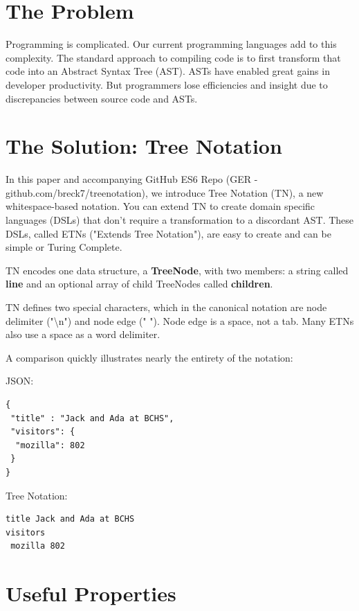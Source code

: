 \documentclass[journal]{IEEEtran}
\begin{document}
\section{The Problem}

Programming is complicated. Our current programming languages add to this complexity. The standard approach to compiling code is to first transform that code into an Abstract Syntax Tree (AST). ASTs have enabled great gains in developer productivity. But programmers lose efficiencies and insight due to discrepancies between source code and ASTs.

\section{The Solution: Tree Notation}

In this paper and accompanying GitHub ES6 Repo (GER - github.com/breck7/treenotation), we introduce Tree Notation (TN), a new whitespace-based notation. You can extend TN to create domain specific languages (DSLs) that don't require a transformation to a discordant AST. These DSLs, called ETNs ("Extends Tree Notation"), are easy to create and can be simple or Turing Complete.

TN encodes one data structure, a \textbf{TreeNode}, with two members: a string called \textbf{line} and an optional array of child TreeNodes called \textbf{children}.

TN defines two special characters, which in the canonical notation are node delimiter ("\textbackslash n") and node edge (" "). Node edge is a space, not a tab. Many ETNs also use a space as a word delimiter.

A comparison quickly illustrates nearly the entirety of the notation:

JSON:

\begin{lstlisting}
{
 "title" : "Jack and Ada at BCHS",
 "visitors": {
  "mozilla": 802
 }
}
\end{lstlisting}

Tree Notation:

\begin{lstlisting}
title Jack and Ada at BCHS
visitors
 mozilla 802
\end{lstlisting}

\section{Useful Properties}
\end{document}
